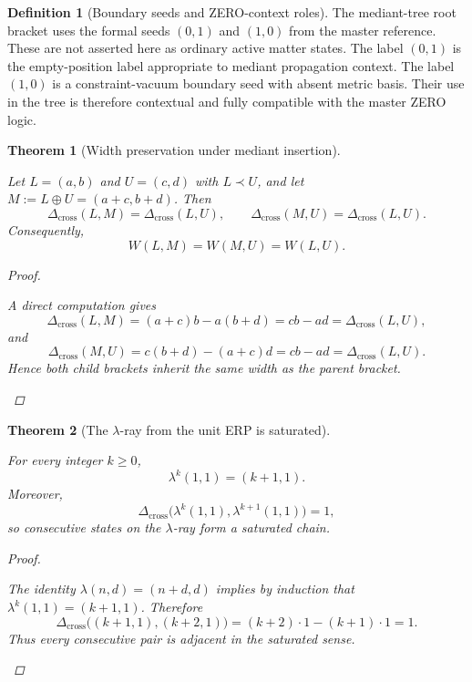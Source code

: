 \documentclass[11pt, letterpaper]{article}
\newcommand{\lop}{\lambda}
\newcommand{\med}{\oplus}
\newcommand{\Dcross}{\Delta_{\mathrm{cross}}}
\theoremstyle{definition}
\newtheorem{definition}{Definition}[section]
\theoremstyle{plain}
\newtheorem{theorem}{Theorem}[section]
\begin{document}
\begin{definition}[Boundary seeds and ZERO-context roles]
The mediant-tree root bracket uses the formal seeds $(0,1)$ and $(1,0)$ from
the master reference.  These are not asserted here as ordinary active matter
states.  The label $(0,1)$ is the empty-position label appropriate to mediant
propagation context.  The label $(1,0)$ is a constraint-vacuum boundary seed
with absent metric basis.  Their use in the tree is therefore contextual and
fully compatible with the master ZERO logic.
\end{definition}

\begin{theorem}[Width preservation under mediant insertion]
\begin{rsbox}
Let $L=(a,b)$ and $U=(c,d)$ with $L\prec U$, and let $M:=L\med U=(a+c,b+d)$.
Then
\[
\Dcross(L,M)=\Dcross(L,U),
\qquad
\Dcross(M,U)=\Dcross(L,U).
\]
Consequently,
\[
W(L,M)=W(M,U)=W(L,U).
\]
\end{rsbox}
\begin{proof}
\begin{rsbox}
A direct computation gives
\[
\Dcross(L,M)=(a+c)b-a(b+d)=cb-ad=\Dcross(L,U),
\]
and
\[
\Dcross(M,U)=c(b+d)-(a+c)d=cb-ad=\Dcross(L,U).
\]
Hence both child brackets inherit the same width as the parent bracket.
\end{rsbox}
\end{proof}

\end{theorem}

\begin{theorem}[The $\lop$-ray from the unit ERP is saturated]
\begin{rsbox}
For every integer $k\geq 0$,
\[
\lop^{k}(1,1)=(k+1,1).
\]
Moreover,
\[
\Dcross\!\bigl(\lop^{k}(1,1),\lop^{k+1}(1,1)\bigr)=1,
\]
so consecutive states on the $\lop$-ray form a saturated chain.
\end{rsbox}
\begin{proof}
\begin{rsbox}
The identity $\lop(n,d)=(n+d,d)$ implies by induction that
$\lop^{k}(1,1)=(k+1,1)$.  Therefore
\[
\Dcross\!\bigl((k+1,1),(k+2,1)\bigr)=(k+2)\cdot 1-(k+1)\cdot 1=1.
\]
Thus every consecutive pair is adjacent in the saturated sense.
\end{rsbox}
\end{proof}

\end{theorem}
\end{document}

